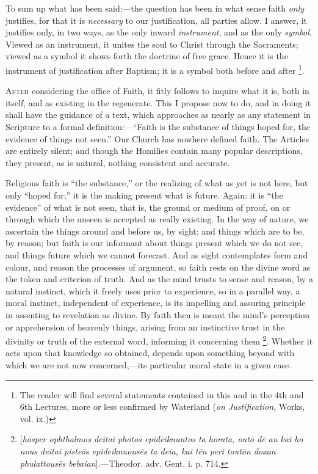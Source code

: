 To sum up what has been said:—the question has been in what sense
faith \emph{only} justifies, for that it is \emph{necessary} to our
justification, all parties allow. I answer, it justifies only, in two
ways, as the only inward \emph{instrument}, and as the only \emph{symbol}.
Viewed as an instrument, it unites the soul to Christ through the
Sacraments; viewed as a symbol it shows forth the doctrine of free
grace. Hence it is the instrument of justification after Baptism; it
is a symbol both before and after \footnote{The reader
will find several statements contained in this and in the 4th and 6th
Lectures, more or less confirmed by Waterland (\emph{on Justification},
Works, vol. ix.)}.


A\textsc{fter} considering the office of Faith, it fitly follows to
inquire what it is, both in itself, and as existing in the regenerate.
This I propose now to do, and in doing it shall have the guidance of a
text, which approaches as nearly as any statement in Scripture to a
formal definition:—``Faith is the substance of things hoped for,
the evidence of things not seen.'' Our Church has nowhere defined
faith. The Articles are entirely silent; and though the Homilies
contain many popular descriptions, they present, as is natural,
nothing consistent and accurate.

Religious faith is ``the substance,'' or the realizing of
what as yet is not here, but only ``hoped for;'' it is the
making present what is future. Again: it is ``the evidence''
of what is not seen, that is, the ground or medium of proof, on or
through which the unseen is accepted as really existing. In the way of
nature, we ascertain the things around and before us, by sight; and
things which are to be, by reason; but faith is our informant about
things present which we do not see, and things future which we cannot
forecast. And as sight contemplates form and colour, and reason the
processes of argument, so faith rests on the divine word as the
token and criterion of truth. And as the mind trusts to sense and
reason, by a natural instinct, which it freely uses prior to
experience, so in a parallel way, a moral instinct, independent of
experience, is its impelling and assuring principle in assenting to
revelation as divine. By faith then is meant the mind's perception or
apprehension of heavenly things, arising from an instinctive trust in
the divinity or truth of the external word, informing it concerning
them \footnote{[\emph{h\={o}sper ophthalmos deitai ph\={o}tos epideiknuntos
ta horata, out\={o} d\={e} au kai ho nous deitai piste\={o}s
epideiknuous\={e}s ta deia, kai t\={e}n peri tout\={o}n doxan
phulattous\={e}s bebaian}].—Theodor.
adv. Gent. i. p. 714.}. Whether it acts
upon that knowledge so obtained, depends upon something beyond with
which we are not now concerned,—its particular moral state in a
given case.


